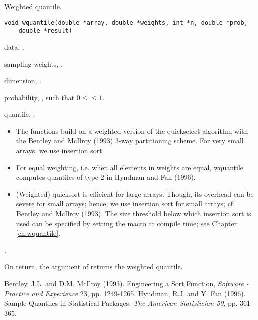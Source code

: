 \documentclass[a4paper,oneside,10pt,DIV=12]{scrreprt}
\begin{document}
\begin{Description}
Weighted quantile.
\end{Description}
\begin{Usage}
\begin{verbatim}
void wquantile(double *array, double *weights, int *n, double *prob, 
    double *result)
\end{verbatim}
\end{Usage}
\begin{Arguments}
	\begin{ldescription}
		\item[\code{array}] data, . 
		\item[\code{weights}] sampling weights, . 
		\item[\code{n}] dimension, . 
		\item[\code{prob}] probability, , such that 
			$0 \leq$$\leq 1$. 
		\item[\code{result}] quantile, . 
	\end{ldescription}
\end{Arguments}
\begin{Details}
	\begin{itemize}
	\item The functions build on a weighted version of the quickselect 
		algorithm with the Bentley and McIlroy (1993) 3-way partitioning scheme. 
		For very small arrays, we use insertion sort.
	\item For equal weighting, i.e. when all elements in weights are equal, 
		wquantile computes quantiles of type 2 in Hyndman and Fan (1996).
	\item (Weighted) quicksort is efficient for large arrays. Though, its 
		overhead can be severe for small arrays; hence, we use insertion sort 
		for small arrays; cf. Bentley and McIlroy (1993). The size threshold 
		below which insertion sort is used can be specified by setting the 
		macro  at compile time; see Chapter
		\ref{ch:wquantile}. 
	\end{itemize}
\end{Details}
\begin{Dependency}
	.	
\end{Dependency}
\begin{Value}
	On return, the argument  of  returns the 
	weighted quantile.
\end{Value}
\begin{References}\relax
Bentley, J.L. and D.M. McIlroy (1993). Engineering a Sort Function, 
	\textit{Software - Practice and Experience} 23, pp. 1249-1265.
Hyndman, R.J. and Y. Fan (1996). Sample Quantiles in Statistical Packages, 
	\textit{The American Statistician 50}, pp. 361-365. 
\end{References}
\end{document}
